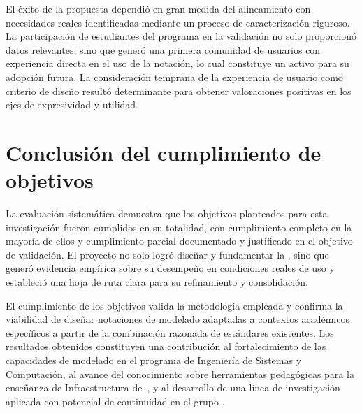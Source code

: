 El éxito de la propuesta dependió en gran medida del alineamiento con necesidades reales identificadas mediante un proceso de caracterización riguroso. La participación de estudiantes del programa en la validación no solo proporcionó datos relevantes, sino que generó una primera comunidad de usuarios con experiencia directa en el uso de la notación, lo cual constituye un activo para su adopción futura. La consideración temprana de la experiencia de usuario como criterio de diseño resultó determinante para obtener valoraciones positivas en los ejes de expresividad y utilidad.

\section{Conclusión del cumplimiento de objetivos}
\noindent

La evaluación sistemática demuestra que los objetivos planteados para esta investigación fueron cumplidos en su totalidad, con cumplimiento completo en la mayoría de ellos y cumplimiento parcial documentado y justificado en el objetivo de validación. El proyecto no solo logró diseñar y fundamentar la \NDITI, sino que generó evidencia empírica sobre su desempeño en condiciones reales de uso y estableció una hoja de ruta clara para su refinamiento y consolidación.

El cumplimiento de los objetivos valida la metodología empleada y confirma la viabilidad de diseñar notaciones de modelado adaptadas a contextos académicos específicos a partir de la combinación razonada de estándares existentes. Los resultados obtenidos constituyen una contribución al fortalecimiento de las capacidades de modelado en el programa de Ingeniería de Sistemas y Computación, al avance del conocimiento sobre herramientas pedagógicas para la enseñanza de Infraestructura de~\TI, y al desarrollo de una línea de investigación aplicada con potencial de continuidad en el grupo \GRID.